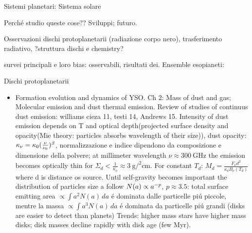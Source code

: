 \documentclass[10pt,xcolor={usenames},fleqn,serif]{beamer}
\begin{document}



\begin{frame}
  \titlepage
\end{frame}


\begin{frame}[label={argomenti}]{Sistemi planetari: Sistema solare}
\tableofcontents[onlyparts]
\end{frame}

\begin{wordonframe}{Perch\'e studio queste cose?? Sviluppi; futuro.}

Osservazioni dischi protoplanetarii (radiazione corpo nero), trasferimento radiativo, ?struttura dischi e chemistry?

survei principali e loro bias: osservabili, risultati dei. Ensemble esopianeti:

\end{wordonframe}

\begin{wordonframe}{Dischi protoplanetarii}

\begin{itemize}
\item Formation evolution and dynamics of YSO.
Ch 2: Mass of dust and gas; Molecular emission and dust thermal emission.
Review of studies of continuus dust emission: williams cieza 11, testi 14, Andrews 15.
Intensity of dust emission depends on T and optical depth(projected surface density and opacity(Mie theory: particles absorbs wavelength of their size)),
dust opacity: $\kappa_{\nu}=\kappa_0(\frac{\nu}{\nu_0})^{\beta}$, normalizzazione e indice dipendono da composizione e dimensione della polvere; at millimeter wavelength $\nu\approx\SI{300}{\giga\hertz}$ the emission becomes optically thin for $\Sigma_d<\frac{1}{\kappa_{\nu}}\approx\SI{3}{\gram\per\squared\cm}$. For constant $T_d$: $M_d=\frac{F_{\nu}d^2}{\kappa_{\nu}B_{\nu}(T_d)}$ where d is distance os source.
Until self-gravity becomes important the distribution of particles size a follow $N(a)\propto a^{-p}$, $p\approx3.5$: total surface emitting area $\propto\int a^2N(a)\,da$ \'e dominata dalle particelle pi\'u piccole, mentre la massa $\propto\int a^3N(a)\,da$ \'e dominata da particelle pi\'u grandi (disks are easier to detect than planets)
Trends: higher mass stars have higher mass disks; disk masses decline rapidly with disk age (few Myr).

\end{itemize}

\end{wordonframe}
\end{document}
